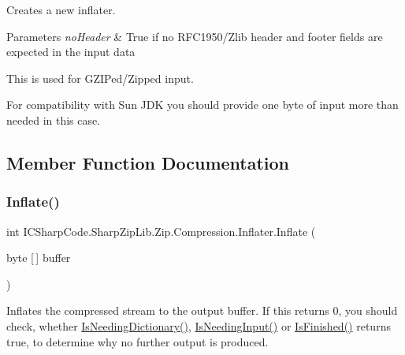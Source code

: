Creates a new inflater. 


\begin{DoxyParams}{Parameters}
{\em no\+Header} & True if no R\+F\+C1950/\+Zlib header and footer fields are expected in the input data\\
\hline
\end{DoxyParams}
This is used for G\+Z\+I\+Ped/\+Zipped input.

For compatibility with Sun J\+DK you should provide one byte of input more than needed in this case. 

\subsection{Member Function Documentation}
\mbox{\label{class_i_c_sharp_code_1_1_sharp_zip_lib_1_1_zip_1_1_compression_1_1_inflater_a73bfcbd5d20b4838bd28364fff12324e}} 
\subsubsection{\texorpdfstring{Inflate()}{Inflate()}\hspace{0.1cm}{\footnotesize\ttfamily [1/4]}}
{\footnotesize\ttfamily int I\+C\+Sharp\+Code.\+Sharp\+Zip\+Lib.\+Zip.\+Compression.\+Inflater.\+Inflate (\begin{DoxyParamCaption}\item[{byte \mbox{[}$\,$\mbox{]}}]{buffer }\end{DoxyParamCaption})\hspace{0.3cm}{\ttfamily [inline]}}



Inflates the compressed stream to the output buffer. If this returns 0, you should check, whether \hyperlink{class_i_c_sharp_code_1_1_sharp_zip_lib_1_1_zip_1_1_compression_1_1_inflater_a9db69836f41167ffd5e0d1dc5832594c}{Is\+Needing\+Dictionary()}, \hyperlink{class_i_c_sharp_code_1_1_sharp_zip_lib_1_1_zip_1_1_compression_1_1_inflater_a3033837c6e5987009c6bf51c4952a5fc}{Is\+Needing\+Input()} or \hyperlink{class_i_c_sharp_code_1_1_sharp_zip_lib_1_1_zip_1_1_compression_1_1_inflater_a0ade6f928ed3c7d1a9c8c9919c98141e}{Is\+Finished()} returns true, to determine why no further output is produced. 


